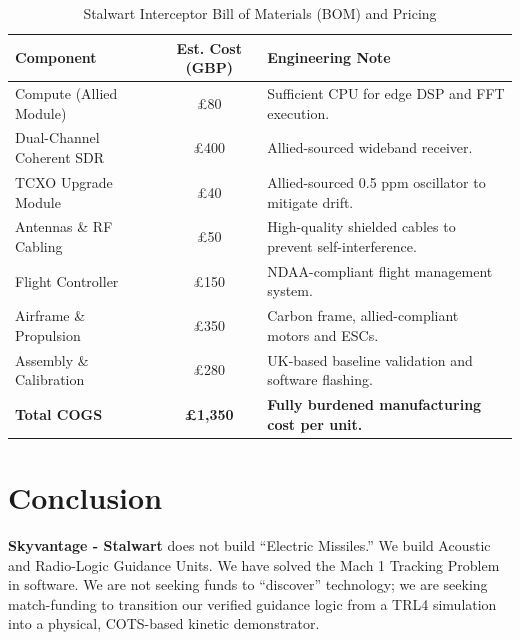 \documentclass[a4paper,11pt]{article}
\begin{document}
\begin{table}[ht]
\centering
\color{brandgrey}
\begin{tabularx}{\textwidth}{|l|c|X|}
\hline
\rowcolor{brandlightgrey} \textbf{Component} & \textbf{Est. Cost (GBP)} & \textbf{Engineering Note} \\ \hline
Compute (Allied Module) & £80 & Sufficient CPU for edge DSP and FFT execution. \\ \hline
Dual-Channel Coherent SDR & £400 & Allied-sourced wideband receiver. \\ \hline
TCXO Upgrade Module & £40 & Allied-sourced 0.5 ppm oscillator to mitigate drift. \\ \hline
Antennas \& RF Cabling & £50 & High-quality shielded cables to prevent self-interference. \\ \hline
Flight Controller & £150 & NDAA-compliant flight management system. \\ \hline
Airframe \& Propulsion & £350 & Carbon frame, allied-compliant motors and ESCs. \\ \hline
Assembly \& Calibration & £280 & UK-based baseline validation and software flashing. \\ \hline
\textbf{Total COGS} & \textbf{£1,350} & \textbf{Fully burdened manufacturing cost per unit.} \\ \hline
\end{tabularx}
\caption{Stalwart Interceptor Bill of Materials (BOM) and Pricing}
\label{tab:bom}
\end{table}

\section{Conclusion}

\textbf{Skyvantage - Stalwart} does not build ``Electric Missiles.'' We build Acoustic and Radio-Logic Guidance Units. We have solved the Mach 1 Tracking Problem in software. We are not seeking funds to ``discover'' technology; we are seeking match-funding to transition our verified guidance logic from a TRL4 simulation into a physical, COTS-based kinetic demonstrator.
\end{document}
